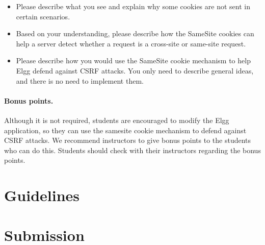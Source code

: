 \begin{itemize}
\item Please describe what you see and explain why some cookies are 
not sent in certain scenarios. 
 
\item Based on your understanding, please describe how the SameSite
cookies can help a server detect whether a request 
is a cross-site or same-site request. 

\item Please describe how you would use
the SameSite cookie mechanism to help Elgg defend against CSRF attacks. 
You only need to describe general ideas, and there is no need to 
implement them. 
\end{itemize}


\paragraph{Bonus points.} Although it is not required, students
are encouraged to modify the Elgg application, so they
can use the samesite cookie mechanism to defend against
CSRF attacks. We recommend instructors to give bonus points 
to the students who can do this. Students should check with 
their instructors regarding the bonus points.


\section{Guidelines}





\section{Submission}











